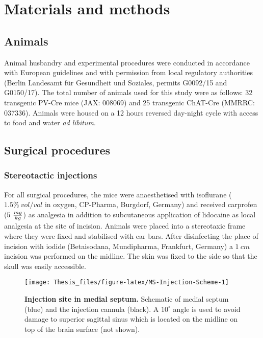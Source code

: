 \documentclass[
  12pt,
  a4paper,
  openany]{book}
\begin{document}
\hypertarget{methods}{%
\chapter{Materials and methods}\label{methods}}

\hypertarget{animals}{%
\section{Animals}\label{animals}}

Animal husbandry and experimental procedures were conducted in accordance with European guidelines and with permission from local regulatory authorities (Berlin Landesamt für Gesundheit und Soziales, permits G0092/15 and G0150/17). The total number of animals used for this study were as follows: 32 transgenic PV-Cre mice (JAX: 008069) and 25 transgenic ChAT-Cre (MMRRC: 037336). Animals were housed on a 12 hours reversed day-night cycle with access to food and water \emph{ad libitum}.

\hypertarget{surgical-procedures}{%
\section{Surgical procedures}\label{surgical-procedures}}

\hypertarget{injections}{%
\subsection{Stereotactic injections}\label{injections}}

For all surgical procedures, the mice were anaesthetised with isoflurane (\(1.5\%\ vol/vol\) in oxygen, CP-Pharma, Burgdorf, Germany) and received carprofen (\(5\ \frac{mg}{kg} \textstyle\)) as analgesia in addition to subcutaneous application of lidocaine as local analgesia at the site of incision. Animals were placed into a stereotaxic frame where they were fixed and stabilised with ear bars. After disinfecting the place of incision with iodide (Betaisodana, Mundipharma, Frankfurt, Germany) a \(1\ cm\) incision was performed on the midline. The skin was fixed to the side so that the skull was easily accessible.




\begin{figure}[H]

{\centering \texttt{[image: Thesis\_files/figure-latex/MS-Injection-Scheme-1]} 

}

\caption[Injection site in medial septum]{\textbf{Injection site in medial septum.} Schematic of medial septum (blue) and the injection cannula (black). A \(10^{\circ}\) angle is used to avoid damage to superior sagittal sinus which is located on the midline on top of the brain surface (not shown).}\label{fig:MS-Injection-Scheme}
\end{figure}
\end{document}
